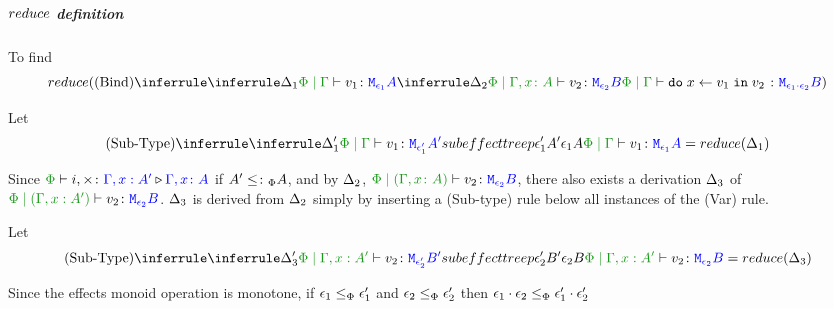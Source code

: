 {        
    
            \subparagraph{$reduce$ definition}

            To find
            \begin{equation}
                \reduce(
                    \ntreeruleII{Bind}{
                        \treeruleI{
                            \D_1
                        }{
                            \gpetyperelation{v_1}{\M{\e_1}{A}}
                        }
                         }{ 
                        \treeruleI{
                            \D_2
                        }{
                            \etyperelation{\P}{\gax}{v_2}{\M{\e_2}{B}}
                        }
                    } {
                        \gpetyperelation{\doin{x}{v_1}{v_2}}{\M{\e_1\dot\e_2}{B}}
                    }
                )
            \end{equation}


            Let \begin{equation}
                \ntreeruleII{Sub-Type}{
                    \treeruleI{\D'_1}{\gpetyperelation{v_1}{\M{\e'_1}{A'}}}
                 }{ 
                subeffecttreep{\e_1'}{A'}{\e_1}{A}
                }{
                    \gpetyperelation{v_1}{\M{\e_1}{A}}
                } = \reduce(\D_1)
            \end{equation}

            Since $\ewrel{\P}{i,\x}{\G, x: A'}{\gax}$ if $A' \leq\colon_\Phi A$, and by $\Delta_2$, $\etyperelation{\P}{(\gax)}{v_2}{\M{\e_2}{B}}$, there also exists a derivation $\Delta_3$ of $\etyperelation{\P}{(\G, x: A')}{v_2}{\M{\e_2}{B}}$. $\Delta_3$ is derived from $\Delta_2$ simply by inserting a (Sub-type) rule below all instances of the (Var) rule.

            Let \begin{equation}
                \ntreeruleII{Sub-Type}{
                    \treeruleI{\D'_3}{\etyperelation{\P}{\G, x: A'}{v_2}{\M{\e'_2}{B'}}}
                 }{ 
                subeffecttreep{\e_2'}{B'}{\e_2}{B}
                }{
                    \etyperelation{\P}{\G, x: A'}{v_2}{\M{\e_2}{B}}
                } = \reduce(\D_3)
            \end{equation}
            

            Since the effects monoid operation is monotone, if $\epsilon_1\leq_{\Phi}\epsilon_1'$ and $\epsilon_2\leq_{\Phi}\epsilon_2'$ then $\epsilon_1\cdot\epsilon_2 \leq_{\Phi} \epsilon_1'\cdot\epsilon_2'$
            


}
